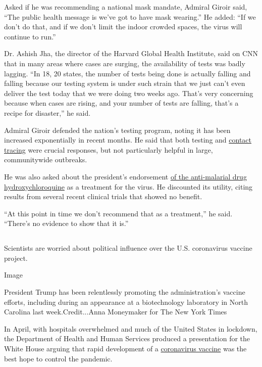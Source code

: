 Asked if he was recommending a national mask mandate, Admiral Giroir
said, ``The public health message is we've got to have mask wearing.''
He added: ``If we don't do that, and if we don't limit the indoor
crowded spaces, the virus will continue to run.''

Dr. Ashish Jha, the director of the Harvard Global Health Institute,
said on CNN that in many areas where cases are surging, the availability
of tests was badly lagging. ``In 18, 20 states, the number of tests
being done is actually falling and falling because our testing system is
under such strain that we just can't even deliver the test today that we
were doing two weeks ago. That's very concerning because when cases are
rising, and your number of tests are falling, that's a recipe for
disaster,'' he said.

Admiral Giroir defended the nation's testing program, noting it has been
increased exponentially in recent months. He said that both testing and
\href{https://www.nytimes3xbfgragh.onion/2020/07/31/health/covid-contact-tracing-tests.html}{contact
tracing} were crucial responses, but not particularly helpful in large,
communitywide outbreaks.

He was also asked about the president's endorsement
\href{https://www.nytimes3xbfgragh.onion/2020/07/28/technology/virus-video-trump.html}{of
the anti-malarial drug hydroxychloroquine} as a treatment for the virus.
He discounted its utility, citing results from several recent clinical
trials that showed no benefit.

``At this point in time we don't recommend that as a treatment,'' he
said. ``There's no evidence to show that it is.''

\hypertarget{-1}{%
\subsection{}\label{-1}}

Scientists are worried about political influence over the U.S.
coronavirus vaccine project.

Image

President Trump has been relentlessly promoting the administration's
vaccine efforts, including during an appearance at a biotechnology
laboratory in North Carolina last week.Credit...Anna Moneymaker for The
New York Times

In April, with hospitals overwhelmed and much of the United States in
lockdown, the Department of Health and Human Services produced a
presentation for the White House arguing that rapid development of a
\href{https://www.nytimes3xbfgragh.onion/interactive/2020/science/coronavirus-vaccine-tracker.html}{coronavirus
vaccine} was the best hope to control the pandemic.

